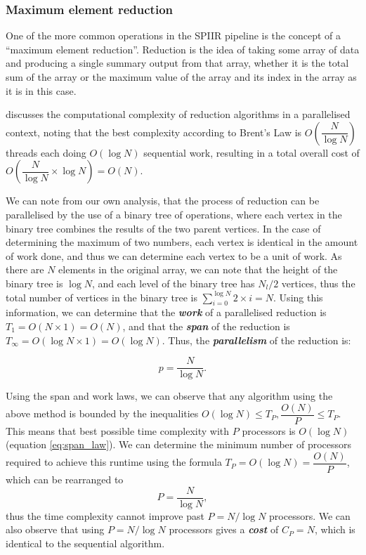 \documentclass{article}
\begin{document}
\subsubsection{Maximum element reduction} \label{sec:discuss:analysis:reduce}

One of the more common operations in the SPIIR pipeline is the concept of a ``maximum element reduction''.
Reduction is the idea of taking some array of data and producing a single summary output from that array, whether it is the total sum of the array or the maximum value of the array and its index in the array as it is in this case.

\cite{reduction} discusses the computational complexity of reduction algorithms in a parallelised context, noting that the best complexity according to Brent's Law is \(O(\dfrac{N}{\log N})\) threads each doing \(O(\log N)\) sequential work, resulting in a total overall cost of \(O(\dfrac{N}{\log N}\times{\log N}) = O(N)\).

We can note from our own analysis, that the process of reduction can be parallelised by the use of a binary tree of operations, where each vertex in the binary tree combines the results of the two parent vertices.
In the case of determining the maximum of two numbers, each vertex is identical in the amount of work done, and thus we can determine each vertex to be a unit of work.
As there are \(N\) elements in the original array, we can note that the height of the binary tree is \(\log N\), and each level of the binary tree has \(N_l/2\) vertices, thus the total number of vertices in the binary tree is \(\sum_{i=0}^{\log N}{2\times{i}} = N\).
Using this information, we can determine that the \textit{\textbf{work}} of a parallelised reduction is \(T_1 = O(N\times1) = O(N)\), and that the \textit{\textbf{span}} of the reduction is \(T_\infty = O(\log N \times {1}) = O(\log N)\).
Thus, the \textit{\textbf{parallelism}} of the reduction is:

\[
    p = \dfrac{N}{\log N}.
\]

Using the span and work laws, we can observe that any algorithm using the above method is bounded by the inequalities \(O(\log N) \leq T_P, \dfrac{O(N)}{P} \leq T_P\).
This means that best possible time complexity with \(P\) processors is \(O(\log N)\) (equation \ref{eq:span_law}).
We can determine the minimum number of processors required to achieve this runtime using the formula \(T_P = O(\log N) = \dfrac{O(N)}{P}\), which can be rearranged to
\[
    P = \dfrac{N}{\log N},
\]
thus the time complexity cannot improve past \(P = N/\log N\) processors.
We can also observe that using \(P = N/\log N\) processors gives a \textit{\textbf{cost}} of \(C_P = N\), which is identical to the sequential algorithm.
\\
\end{document}
